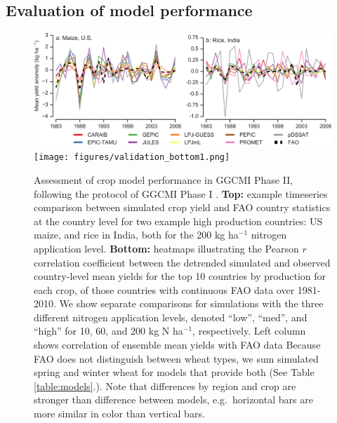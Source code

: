 \documentclass[gmd, manuscript]{copernicus} %
\begin{document}
\subsection{Evaluation of model performance}
\begin{figure}[ht]
  \centering
  \includegraphics[width=14cm]{figures/validation_top.png}
  \texttt{[image: figures/validation\_bottom1.png]}
  \caption{
  Assessment of crop model performance in GGCMI Phase II, following the protocol of GGCMI Phase I \citep{muller_global_2017}. 
  \textbf{Top:} example timeseries comparison between simulated crop yield and FAO country statistics \citep{FAOSTAT} at the country level for two example high production countries: US maize, and rice in India, both for the 200 kg ha$^{-1}$ nitrogen application level. 
  \textbf{Bottom:} heatmaps illustrating the Pearson $r$ correlation coefficient between the detrended simulated and observed country-level mean yields for the top 10 countries by production for each crop, of those countries with continuous FAO data over 1981-2010.
  We show separate comparisons for simulations with the three different nitrogen application levels, denoted ``low'', ``med'', and ``high'' for 10, 60, and 200 kg N ha$^{-1}$, respectively. 
  Left column shows correlation of ensemble mean yields with FAO data 
  Because FAO does not distinguish between wheat types, we sum simulated spring and winter wheat for models that provide both (See Table \ref{table:models}.). 
  Note that differences by region and crop are stronger than difference between models, e.g.\ horizontal bars are more similar in color than vertical bars.
  }
  \label{fig:simulation_val}
\end{figure}

\end{document}
